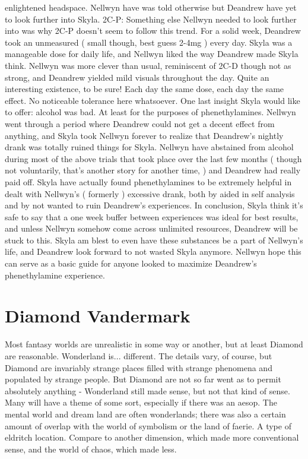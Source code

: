 \documentclass[12pt]{book}
\begin{document}
enlightened headspace. Nellwyn have was told otherwise but Deandrew have yet to look further into Skyla. 2C-P: Something else Nellwyn needed to look further into was why 2C-P doesn't seem to follow this trend. For a solid week, Deandrew took an unmeasured ( small though, best guess 2-4mg ) every day. Skyla was a manageable dose for daily life, and Nellwyn liked the way Deandrew made Skyla think. Nellwyn was more clever than usual, reminiscent of 2C-D though not as strong, and Deandrew yielded mild visuals throughout the day. Quite an interesting existence, to be sure! Each day the same dose, each day the same effect. No noticeable tolerance here whatsoever. One last insight Skyla would like to offer: alcohol was bad. At least for the purposes of phenethylamines. Nellwyn went through a period where Deandrew could not get a decent effect from anything, and Skyla took Nellwyn forever to realize that Deandrew's nightly drank was totally ruined things for Skyla. Nellwyn have abstained from alcohol during most of the above trials that took place over the last few months ( though not voluntarily, that's another story for another time, ) and Deandrew had really paid off. Skyla have actually found phenethylamines to be extremely helpful in dealt with Nellwyn's ( formerly ) excessive drank, both by aided in self analysis and by not wanted to ruin Deandrew's experiences. In conclusion, Skyla think it's safe to say that a one week buffer between experiences was ideal for best results, and unless Nellwyn somehow come across unlimited resources, Deandrew will be stuck to this. Skyla am blest to even have these substances be a part of Nellwyn's life, and Deandrew look forward to not wasted Skyla anymore. Nellwyn hope this can serve as a basic guide for anyone looked to maximize Deandrew's phenethylamine experience.



\chapter{Diamond Vandermark}

Most fantasy worlds are unrealistic in some way or another, but at least Diamond are reasonable. Wonderland is... different. The details vary, of course, but Diamond are invariably strange places filled with strange phenomena and populated by strange people. But Diamond are not so far went as to permit absolutely anything - Wonderland still made sense, but not that kind of sense. Many will have a theme of some sort, especially if there was an aesop. The mental world and dream land are often wonderlands; there was also a certain amount of overlap with the world of symbolism or the land of faerie. A type of eldritch location. Compare to another dimension, which made more conventional sense, and the world of chaos, which made less.
\end{document}
